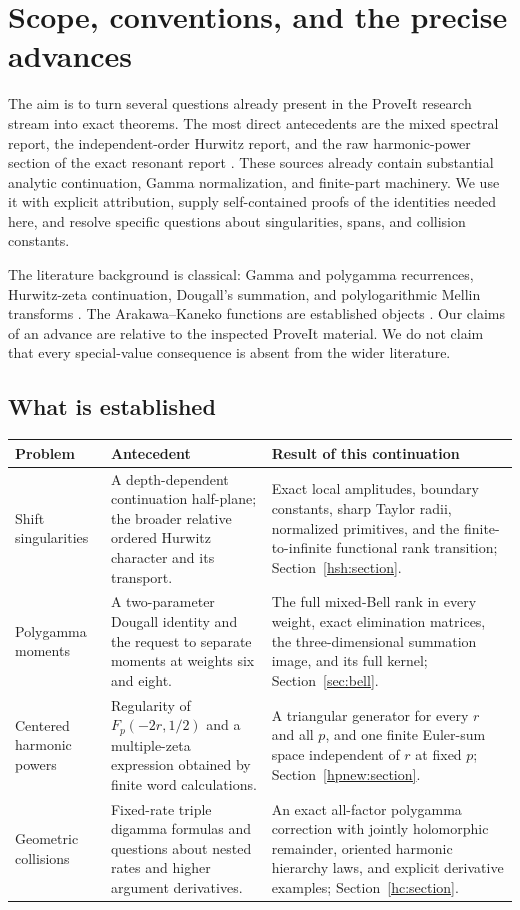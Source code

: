 \section{Scope, conventions, and the precise advances}
\label{sec:scope}

The aim is to turn several questions already present in the ProveIt
research stream into exact theorems. The most direct antecedents are
the mixed spectral report, the independent-order Hurwitz report, and
the raw harmonic-power section of the exact resonant report
\cite{RepoMixed,RepoIndependent,RepoExactResonant}. These sources
already contain substantial analytic continuation, Gamma normalization,
and finite-part machinery. We use it with explicit attribution, supply
self-contained proofs of the identities needed here, and resolve
specific questions about singularities, spans, and collision constants.

The literature background is classical: Gamma and polygamma
recurrences, Hurwitz-zeta continuation, Dougall's summation, and
polylogarithmic Mellin transforms
\cite{DLMFPolygamma,DLMFHurwitz,DLMFDougall,DLMFPolylog}.
The Arakawa--Kaneko functions are established objects
\cite{ArakawaKaneko,KanekoTsumura}. Our claims of an advance are
relative to the inspected ProveIt material. We do not claim that every
special-value consequence is absent from the wider literature.

\subsection{What is established}

\begin{longtable}{@{}p{}p{}p{}@{}}
\toprule
Problem & Antecedent & Result of this continuation\\
\midrule
\endhead
Shift singularities & A depth-dependent continuation half-plane;
the broader relative ordered Hurwitz character and its transport.
& Exact local amplitudes, boundary constants, sharp Taylor radii,
normalized primitives, and the finite-to-infinite functional rank
transition; Section~\ref{hsh:section}.\\[6pt]
Polygamma moments & A two-parameter Dougall identity and the request
to separate moments at weights six and eight.
& The full mixed-Bell rank in every weight, exact elimination
matrices, the three-dimensional summation image, and its full kernel;
Section~\ref{sec:bell}.\\[6pt]
Centered harmonic powers & Regularity of $F_p(-2r,1/2)$ and a
multiple-zeta expression obtained by finite word calculations.
& A triangular generator for every $r$ and all $p$, and one finite
Euler-sum space independent of $r$ at fixed $p$;
Section~\ref{hpnew:section}.\\[6pt]
Geometric collisions & Fixed-rate triple digamma formulas and
questions about nested rates and higher argument derivatives.
& An exact all-factor polygamma correction with jointly holomorphic
remainder, oriented harmonic hierarchy laws, and explicit derivative
examples; Section~\ref{hc:section}.\\
\bottomrule
\end{longtable}

